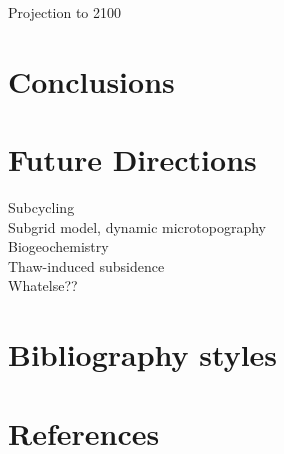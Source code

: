 \documentclass[review]{elsarticle}
\begin{document}
Projection to 2100


\section{Conclusions}
 
\section{Future Directions}
Subcycling \\
Subgrid model, dynamic microtopography \\
Biogeochemistry \\
Thaw-induced subsidence \\
Whatelse?? 


\section{Bibliography styles}


\section*{References}


\end{document}
